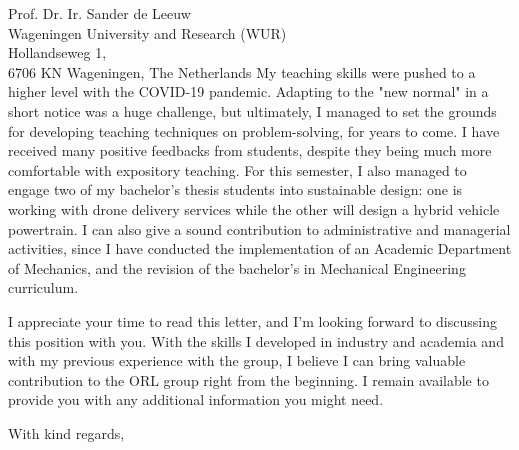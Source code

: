 \documentclass[sender,
    paper=a4,
    version=last,
    fontsize=12pt,
    DIV=13,
    BCOR=0mm]{scrlttr2}
\begin{document}
\begin{letter}{
    Prof. Dr. Ir. Sander de Leeuw \\
    Wageningen University and Research (WUR)\\
    Hollandseweg 1, \\
    6706 KN Wageningen, The Netherlands
}
My teaching skills were pushed to a higher level with the COVID-19 pandemic. Adapting to the "new normal" in a short notice was a huge challenge, but ultimately, I managed to set the grounds for developing teaching techniques on problem-solving, for years to come. I have received many positive feedbacks from students, despite they being much more comfortable with expository teaching. For this semester, I also managed to engage two of my bachelor's thesis students into sustainable design: one is working with drone delivery services while the other will design a hybrid vehicle powertrain. I can also give a sound contribution to administrative and managerial activities, since I have conducted the implementation of an Academic Department of Mechanics, and the revision of the bachelor's in Mechanical Engineering curriculum. 

I appreciate your time to read this letter, and I'm looking forward to discussing this position with you. With the skills I developed in industry and academia and with my previous experience with the group, I believe I can bring valuable contribution to the ORL group right from the beginning. I remain available to provide you with any additional information you might need.

\closing{With kind regards,} %
\vfill

\end{letter}
\end{document}
